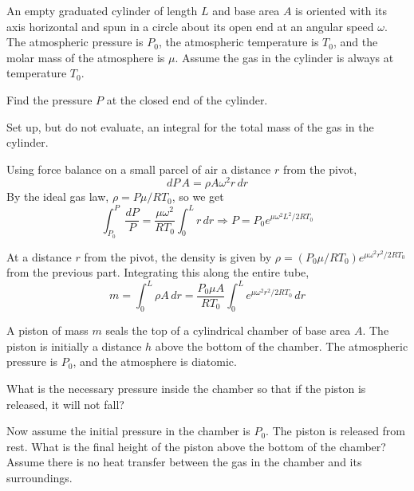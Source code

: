 \documentclass[11pt]{scrartcl}
\begin{document}
\begin{prob}
    An empty graduated cylinder of length $L$ and base area $A$ is oriented with its axis horizontal and spun in a circle about its open end at an angular speed $\omega$. The atmospheric pressure is $P_0$, the atmospheric temperature is $T_0$, and the molar mass of the atmosphere is $\mu$. Assume the gas in the cylinder is always at temperature $T_0$. 
    \begin{anum}
        \item Find the pressure $P$ at the closed end of the cylinder. 
        \item Set up, but do not evaluate, an integral for the total mass of the gas in the cylinder. 
    \end{anum}
\end{prob}

\begin{sol}
    \begin{anum}
        \item Using force balance on a small parcel of air a distance $r$ from the pivot, $$dP \, A=\rho A\omega^2r\, dr$$By the ideal gas law, $\rho=P\mu/RT_0$, so we get $$\int_{P_0}^P\frac{dP}{P}=\frac{\mu\omega^2}{RT_0}\int_0^Lr\, dr\Rightarrow P=\boxed{P_0e^{{\mu\omega^2L^2}/{2RT_0}}}$$
        \item At a distance $r$ from the pivot, the density is given by $\rho=(P_0\mu/RT_0)e^{{\mu\omega^2r^2}/{2RT_0}}$ from the previous part. Integrating this along the entire tube, $$m=\int_0^L\rho A\, dr=\boxed{\frac{P_0\mu A}{RT_0}\int_0^Le^{{\mu\omega^2r^2}/{2RT_0}} \, dr}$$
    \end{anum}
\end{sol}

\begin{prob}
    A piston of mass $m$ seals the top of a cylindrical chamber of base area $A$. The piston is initially a distance $h$ above the bottom of the chamber. The atmospheric pressure is $P_0$, and the atmosphere is diatomic.
    \begin{anum}
        \item What is the necessary pressure inside the chamber so that if the piston is released, it will not fall?
        \item Now assume the initial pressure in the chamber is $P_0$. The piston is released from rest. What is the final height of the piston above the bottom of the chamber? Assume there is no heat transfer between the gas in the chamber and its surroundings.
    \end{anum}
\end{prob}
\end{document}
